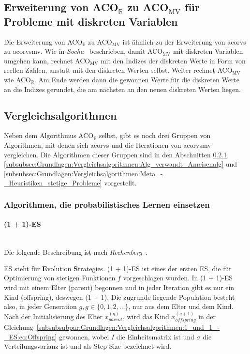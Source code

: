 \documentclass[fontsize=12, a4aper]{scrartcl}
\begin{document}
	\subsection{Erweiterung von ACO\(_\mathbb{R}\) zu ACO\(_\text{MV}\) für Probleme mit diskreten Variablen}
	
	Die Erweiterung von ACO\(_\mathbb{R}\) zu ACO\(_\text{MV}\) ist ähnlich zu der Erweiterung von \acl{acorvs} zu \acl{acorvsmv}. Wie in \textit{Socha}~\cite{socha2009ant} beschrieben, damit ACO\(_\text{MV}\) mit diskreten Variablen umgehen kann, rechnet ACO\(_\text{MV}\) mit den Indizes der diskreten Werte in Form von reellen Zahlen, anstatt mit den diskreten Werten selbst. Weiter rechnet ACO\(_\text{MV}\) wie ACO\(_\mathbb{R}\). Am Ende werden dann die gewonnen Werte für die diskreten Werte an die Indizes gerundet, die am nächsten an den neuen diskreten Werten liegen.
	
	\subsection{Vergleichsalgorithmen} \label{Grundlagen:Vergleichsalgorithmen}
	
	Neben dem Algorithmus ACO\(_\mathbb{R}\) selbst, gibt es noch drei Gruppen von Algorithmen, mit denen sich \ac{acorvs} und die Iterationen von \ac{acorvsmv} vergleichen. Die Algorithmen dieser Gruppen sind in den Abschnitten \ref{subsubsec:Grundlagen:Vergleichsalgorithmen:Alg_prob_Lernen}, \ref{subsubsec:Grundlagen:Vergleichsalgorithmen:Alg_verwandt_Ameisenalg} und \ref{subsubsec:Grundlagen:Vergleichsalgorithmen:Meta_-_Heuristiken_stetige_Probleme} vorgestellt.
	
	\subsubsection{Algorithmen, die probabilistisches Lernen einsetzen} \label{subsubsec:Grundlagen:Vergleichsalgorithmen:Alg_prob_Lernen}
	
	\paragraph{(1 + 1)-ES}\mbox{}\\
	
	Die folgende Beschreibung ist nach \textit{Rechenberg}~\cite{rechenberg1973evolutionsstrategie}.\hfill\newline

	ES steht für \textbf{E}volution \textbf{S}trategies. (1 + 1)-ES ist eines der ersten ES, die für Optimierung von stetigen Funktionen \(f\) vorgeschlagen wurden. In (1 + 1)-ES wird mit einem Elter (parent) begonnen und in jeder Iteration gibt es nur ein Kind (offspring), deswegen (1 + 1). Die zugrunde liegende Population besteht also, in jeder Generation \(g, g \in \{0, 1, 2, \dots\}\), nur aus dem Elter und dem Kind. Nach der Initialisierung des Elter \(x^{(g)}_{parent}\), wird das Kind \(x^{(g + 1)}_{offspring}\) in der Gleichung~\ref{subsubsubpar:Grundlagen:Vergleichsalgorithmen:1_und_1_-_ES:eq:Offspring} gewonnen, wobei \(I\) die Einheitsmatrix ist und \(\sigma\) die Verteilungsvarianz ist und als \glqq Step Size\grqq{} bezeichnet wird.
	
\end{document}
